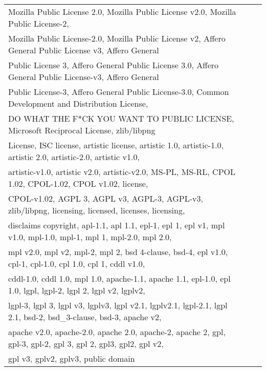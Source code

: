 \begin{table*}
\begin{adjustbox}{width=0.98\textwidth}
\begin{tabular}{lll}
Mozilla Public License 2.0, 
Mozilla Public License v2.0, 
Mozilla Public License-2, \\
Mozilla Public License-2.0, 
Mozilla Public License v2, 
Affero General Public License v3, 
Affero General \\Public License 3, 
Affero General Public License 3.0, 
Affero General Public License-v3, 
Affero General \\Public License-3, 
Affero General Public License-3.0, 
Common Development and Distribution License, \\
DO WHAT THE F*CK YOU WANT TO PUBLIC LICENSE, 
Microsoft Reciprocal License, 
zlib/libpng \\License, 
ISC license, 
artistic license, 
artistic 1.0, 
artistic-1.0, 
artistic 2.0,
artistic-2.0, 
artistic v1.0, \\
artistic-v1.0, 
artistic v2.0, 
artistic-v2.0, 
MS-PL, 
MS-RL, 
CPOL 1.02, 
CPOL-1.02, 
CPOL v1.02,
license,\\
CPOL-v1.02, 
AGPL 3, 
AGPL v3, 
AGPL-3, 
AGPL-v3, 
zlib/libpng,
licensing, 
licensed, 
licenses, 
licensing,\\
disclaims copyright, apl-1.1, apl 1.1, epl-1, epl 1, epl v1, mpl v1.0, mpl-1.0, mpl-1, mpl 1, mpl-2.0, mpl 2.0, \\
mpl v2.0, mpl v2, mpl-2, mpl 2, bsd 4-clause, bsd-4, epl v1.0, cpl-1, cpl-1.0, cpl 1.0, cpl 1, cddl v1.0, \\
cddl-1.0, cddl 1.0, mpl 1.0, apache-1.1, apache 1.1, epl-1.0, epl 1.0, lgpl, lgpl-2, lgpl 2, lgpl v2, lgplv2, \\
lgpl-3, lgpl 3, lgpl v3, lgplv3, lgpl v2.1, lgplv2.1, lgpl-2.1, lgpl 2.1, bsd-2, bsd\_3-clause, bsd-3, apache v2, \\
apache v2.0, apache-2.0, apache 2.0, apache-2, apache 2, gpl, gpl-3, gpl-2, gpl 3, gpl 2, gpl3, gpl2, gpl v2, \\
gpl v3, gplv2, gplv3, public domain\\
\hline
\end{tabular}
\end{adjustbox}
\end{table*}